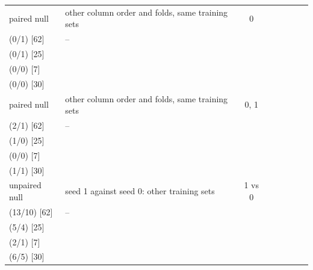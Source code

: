 \begin{tabularx}{\linewidth}{@{}l>{\raggedright\arraybackslash}Xcc>{\raggedright\arraybackslash}p{1.25cm}ccc@{}}
\midrule
paired null & other column order and folds, same training sets & 0 & \begin{tabular}[t]{@{}c@{}}$+0.00$\\{\scriptsize (0/1) [62]}\end{tabular} & {\scriptsize --} & \begin{tabular}[t]{@{}c@{}}$+0.00$\\{\scriptsize (0/1) [25]}\end{tabular} & \begin{tabular}[t]{@{}c@{}}$+0.00$\\{\scriptsize (0/0) [7]}\end{tabular} & \begin{tabular}[t]{@{}c@{}}$-0.00$\\{\scriptsize (0/0) [30]}\end{tabular}\\
paired null & other column order and folds, same training sets & 0, 1 & \begin{tabular}[t]{@{}c@{}}$-0.02$\\{\scriptsize (2/1) [62]}\end{tabular} & {\scriptsize --} & \begin{tabular}[t]{@{}c@{}}$-0.02$\\{\scriptsize (1/0) [25]}\end{tabular} & \begin{tabular}[t]{@{}c@{}}$+0.00$\\{\scriptsize (0/0) [7]}\end{tabular} & \begin{tabular}[t]{@{}c@{}}$-0.02$\\{\scriptsize (1/1) [30]}\end{tabular}\\
unpaired null & seed 1 against seed 0: other training sets & 1 vs 0 & \begin{tabular}[t]{@{}c@{}}$-0.04$\\{\scriptsize (13/10) [62]}\end{tabular} & {\scriptsize --} & \begin{tabular}[t]{@{}c@{}}$-0.02$\\{\scriptsize (5/4) [25]}\end{tabular} & \begin{tabular}[t]{@{}c@{}}$-0.17$\\{\scriptsize (2/1) [7]}\end{tabular} & \begin{tabular}[t]{@{}c@{}}$-0.04$\\{\scriptsize (6/5) [30]}\end{tabular}\\
\bottomrule
\end{tabularx}
